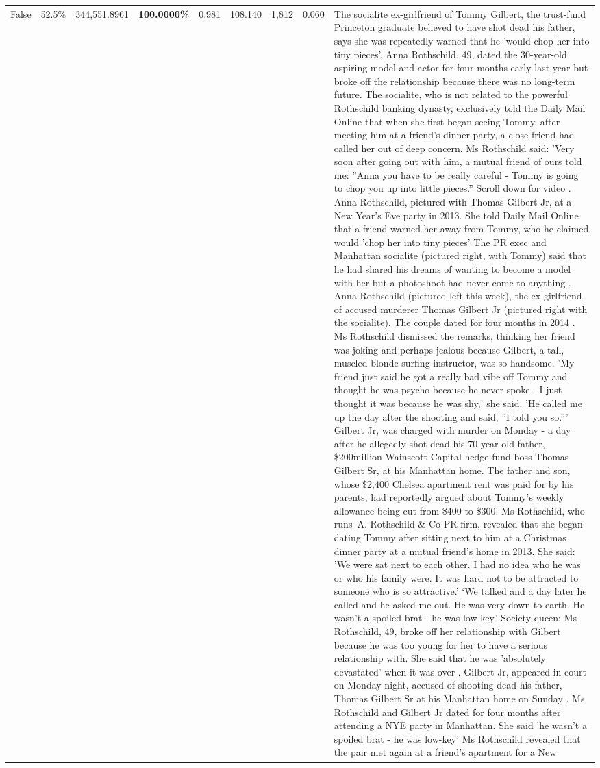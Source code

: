 \begin{table}[H]
\begin{tabular}{lllrlllll}
False & 52.5\% & 344,551.8961 & \bfseries \color{red} 100.0000\% & 0.981 & 108.140 & 1,812 & 0.060 & The socialite ex-girlfriend of Tommy Gilbert, the trust-fund Princeton graduate believed to have shot dead his father, says she was repeatedly warned that he 'would chop her into tiny pieces'. Anna Rothschild, 49, dated the 30-year-old aspiring model and actor for four months early last year but broke off the relationship because there was no long-term future. The socialite, who is not related to the powerful Rothschild banking dynasty, exclusively told the Daily Mail Online that when she first began seeing Tommy, after meeting him at a friend's dinner party, a close friend had called her out of deep concern. Ms Rothschild said: 'Very soon after going out with him, a mutual friend of ours told me: ''Anna you have to be really careful - Tommy is going to chop you up into little pieces.'' Scroll down for video . Anna Rothschild, pictured with Thomas Gilbert Jr, at a New Year's Eve party in 2013. She told Daily Mail Online that a friend warned her away from Tommy, who he claimed would 'chop her into tiny pieces' The PR exec and Manhattan socialite (pictured right, with Tommy) said that he had shared his dreams of wanting to become a model with her but a photoshoot had never come to anything . Anna Rothschild (pictured left this week), the ex-girlfriend of accused murderer Thomas Gilbert Jr (pictured right with the socialite). The couple dated for four months in 2014 . Ms Rothschild dismissed the remarks, thinking her friend was joking and perhaps jealous because Gilbert, a tall, muscled blonde surfing instructor, was so handsome. 'My friend just said he got a really bad vibe off Tommy and thought he was psycho because he never spoke - I just thought it was because he was shy,' she said. 'He called me up the day after the shooting and said, ''I told you so.''' Gilbert Jr, was charged with murder on Monday - a day after he allegedly shot dead his 70-year-old father, \$200million Wainscott Capital hedge-fund boss Thomas Gilbert Sr, at his Manhattan home. The father and son, whose \$2,400 Chelsea apartment rent was paid for by his parents, had reportedly argued about Tommy's weekly allowance being cut from \$400 to \$300. Ms Rothschild, who runs A. Rothschild \& Co PR firm, revealed that she began dating Tommy after sitting next to him at a Christmas dinner party at a mutual friend's home in 2013. She said: 'We were sat next to each other. I had no idea who he was or who his family were. It was hard not to be attracted to someone who is so attractive.' ‘We talked and a day later he called and he asked me out. He was very down-to-earth. He wasn’t a spoiled brat - he was low-key.’ Society queen: Ms Rothschild, 49, broke off her relationship with Gilbert because he was too young for her to have a serious relationship with. She said that he was 'absolutely devastated' when it was over . Gilbert Jr, appeared in court on Monday night, accused of shooting dead his father, Thomas Gilbert Sr at his Manhattan home on Sunday . Ms Rothschild and Gilbert Jr dated for four months after attending a NYE party in Manhattan. She said 'he wasn't a spoiled brat - he was low-key' Ms Rothschild revealed that the pair met again at a friend’s apartment for a New 
\end{tabular}
\end{table}
